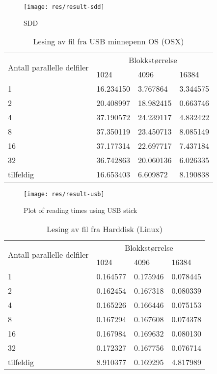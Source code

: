 \documentclass[titlepage]{article}
\begin{document}
\begin{figure}[h!]
  \caption{SDD}
  \label{fig:sdd}
  \centering
  \texttt{[image: res/result-sdd]}
\end{figure}


\begin{table}[h!]
\caption{Lesing av fil fra USB minnepenn OS (OSX)}
\label{USB}
\centering
\begin{tabular}{|l|l|l|l|}
\hline
\multirow{2}{*}{ Antall parallelle delfiler} & \multicolumn{3}{|c|}{Blokkstørrelse} \\
 & 1024 & 4096 & 16384\\
\hline
1         &  16.234150 &   3.767864 &  3.344575 \\
2         &  20.408997 &  18.982415 &  0.663746 \\
4         &  37.190572 &  24.239117 &  4.832422 \\
8         &  37.350119 &  23.450713 &  8.085149 \\
16        &  37.177314 &  22.697717 &  7.437184 \\
32        &  36.742863 &  20.060136 &  6.026335 \\
tilfeldig &  16.653403 &   6.609872 &  8.190838 \\
\hline
\end{tabular}
\end{table}

\begin{figure}[h!]
  \caption{Plot of reading times using USB stick}
  \label{fig:usb}
  \centering
  \texttt{[image: res/result-usb]}
\end{figure}

\begin{table}[h!]
\caption{Lesing av fil fra Harddisk (Linux)}
\label{HDD}
\centering
\begin{tabular}{|l|l|l|l|}
\hline
\multirow{2}{*}{ Antall parallelle delfiler} & \multicolumn{3}{|c|}{Blokkstørrelse} \\
 & 1024 & 4096 & 16384\\
\hline
1         &  0.164577 &  0.175946 & 0.078445 \\
2         &  0.162454 &  0.167318 & 0.080339 \\
4         &  0.165226 &  0.166446 & 0.075153 \\
8         &  0.167294 &  0.167608 & 0.074378 \\
16        &  0.167984 &  0.169632 & 0.080130 \\
32        &  0.172327 &  0.167756 & 0.076714 \\
tilfeldig &  8.910377 &  0.169295 & 4.817989 \\
\hline
\end{tabular}
\end{table}
\end{document}

